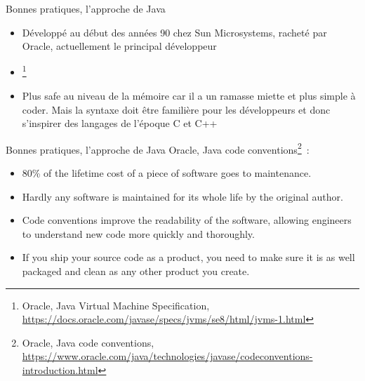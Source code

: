 \documentclass{beamer}
\begin{document}
    \begin{frame}{Bonnes pratiques, l'approche de Java}

        \begin{itemize}

            \item Développé au début des années 90 chez Sun Microsystems, racheté par Oracle, actuellement le principal développeur
            \item {}\footnote{Oracle, Java Virtual Machine Specification, \url{https://docs.oracle.com/javase/specs/jvms/se8/html/jvms-1.html}}
            \item Plus safe au niveau de la mémoire car il a un ramasse miette et plus simple à coder.
            Mais la syntaxe doit être familière pour les développeurs et donc s'inspirer des langages de l'époque C et C++

        \end{itemize}

    \end{frame}

    \begin{frame}{Bonnes pratiques, l'approche de Java}
        Oracle, Java code conventions\footnote{Oracle, Java code conventions, \url{https://www.oracle.com/java/technologies/javase/codeconventions-introduction.html}}~:
        \bigbreak

        \begin{itemize}

            \item 80\% of the lifetime cost of a piece of software goes to maintenance.
            \item Hardly any software is maintained for its whole life by the original author.
            \item Code conventions improve the readability of the software, allowing engineers to understand new code more quickly and thoroughly.
            \item If you ship your source code as a product, you need to make sure it is as well packaged and clean as any other product you create.

        \end{itemize}

    \end{frame}
\end{document}
